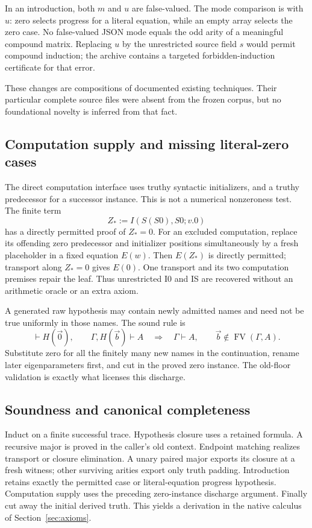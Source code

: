 \documentclass[11pt]{article}
\theoremstyle{definition}\newtheorem{definition}[theorem]{Definition}
\begin{document}
In an introduction, both $m$ and $u$ are false-valued. The mode comparison
is with $u$: zero selects progress for a literal equation, while an
empty array selects the zero case. No false-valued JSON mode equals the
odd arity of a meaningful compound matrix. Replacing $u$ by the
unrestricted source field $s$ would permit compound induction; the
archive contains a targeted forbidden-induction certificate for that error.

These changes are compositions of documented existing techniques. Their
particular complete source files were absent from the frozen corpus,
but no foundational novelty is inferred from that fact.

\subsection{Computation supply and missing literal-zero cases}
The direct computation interface uses truthy syntactic initializers,
and a truthy predecessor for a successor instance. This is not a
numerical nonzeroness test. The finite term
\[
                     Z_*:=I(S(S0),S0;v.0)
\]
has a directly permitted proof of $Z_*=0$. For an excluded computation,
replace its offending zero predecessor and initializer positions
simultaneously by a fresh placeholder in a fixed equation $E(w)$.
Then $E(Z_*)$ is directly permitted; transport along $Z_*=0$ gives
$E(0)$. One transport and its two computation premises repair the
leaf. Thus unrestricted I0 and IS are recovered without an arithmetic
oracle or an extra axiom.

A generated raw hypothesis may contain newly admitted names and need
not be true uniformly in those names. The sound rule is
\[
 \vdash H(\vec0),\qquad\Gamma,H(\vec b)\vdash A
 \quad\Longrightarrow\quad\Gamma\vdash A,
 \qquad\vec b\notin\operatorname{FV}(\Gamma,A).
\]
Substitute zero for all the finitely many new names in the continuation,
rename later eigenparameters first, and cut in the proved zero instance.
The old-floor validation is exactly what licenses this discharge.

\subsection{Soundness and canonical completeness}
Induct on a finite successful trace. Hypothesis closure uses a retained
formula. A recursive major is proved in the caller's old context.
Endpoint matching realizes transport or closure elimination. A unary
paired major exports its closure at a fresh witness; other surviving
arities export only truth padding. Introduction retains exactly the
permitted case or literal-equation progress hypothesis. Computation
supply uses the preceding zero-instance discharge argument. Finally
cut away the initial derived truth. This yields a derivation in the
native calculus of Section~\ref{sec:axioms}.
\end{document}
